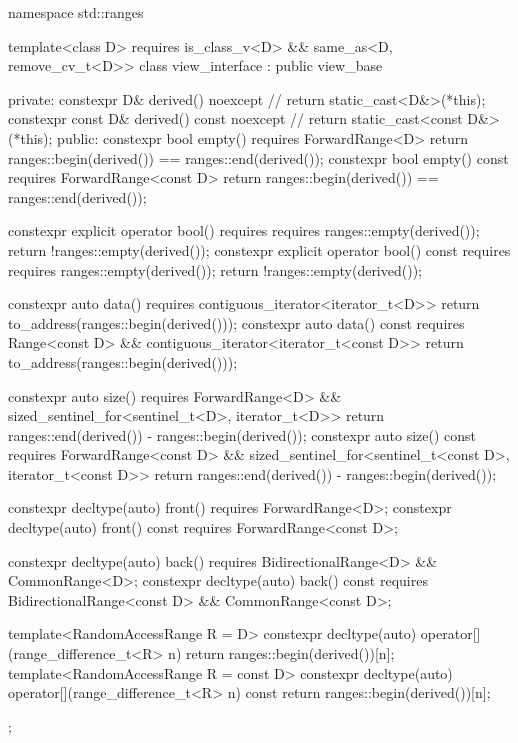 %
\begin{codeblock}
namespace std::ranges {
  template<class D>
    requires is_class_v<D> && same_as<D, remove_cv_t<D>>
  class view_interface : public view_base {
  private:
    constexpr D& derived() noexcept {                   // \expos
      return static_cast<D&>(*this);
    }
    constexpr const D& derived() const noexcept {       // \expos
      return static_cast<const D&>(*this);
    }
  public:
    constexpr bool empty() requires ForwardRange<D> {
      return ranges::begin(derived()) == ranges::end(derived());
    }
    constexpr bool empty() const requires ForwardRange<const D> {
      return ranges::begin(derived()) == ranges::end(derived());
    }

    constexpr explicit operator bool()
      requires requires { ranges::empty(derived()); } {
        return !ranges::empty(derived());
      }
    constexpr explicit operator bool() const
      requires requires { ranges::empty(derived()); } {
        return !ranges::empty(derived());
      }

    constexpr auto data() requires contiguous_iterator<iterator_t<D>> {
      return to_address(ranges::begin(derived()));
    }
    constexpr auto data() const
      requires Range<const D> && contiguous_iterator<iterator_t<const D>> {
        return to_address(ranges::begin(derived()));
      }

    constexpr auto size() requires ForwardRange<D> &&
      sized_sentinel_for<sentinel_t<D>, iterator_t<D>> {
        return ranges::end(derived()) - ranges::begin(derived());
      }
    constexpr auto size() const requires ForwardRange<const D> &&
      sized_sentinel_for<sentinel_t<const D>, iterator_t<const D>> {
        return ranges::end(derived()) - ranges::begin(derived());
      }

    constexpr decltype(auto) front() requires ForwardRange<D>;
    constexpr decltype(auto) front() const requires ForwardRange<const D>;

    constexpr decltype(auto) back() requires BidirectionalRange<D> && CommonRange<D>;
    constexpr decltype(auto) back() const
      requires BidirectionalRange<const D> && CommonRange<const D>;

    template<RandomAccessRange R = D>
      constexpr decltype(auto) operator[](range_difference_t<R> n) {
        return ranges::begin(derived())[n];
      }
    template<RandomAccessRange R = const D>
      constexpr decltype(auto) operator[](range_difference_t<R> n) const {
        return ranges::begin(derived())[n];
      }
  };
}
\end{codeblock}

